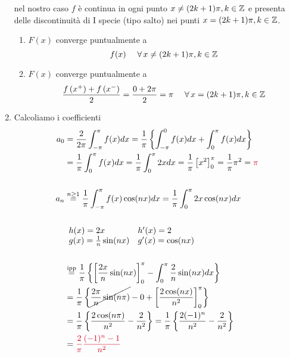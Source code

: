 \begin{enumerate}
nel nostro caso $f$ è continua in ogni punto $x\neq (2k + 1) \pi, k\in \mathbb{Z} $ e presenta delle discontinuità di I specie (tipo salto) nei punti $x = (2k + 1) \pi, k\in \mathbb{Z} $.
\begin{enumerate}
\item $F(x)$ converge puntualmente a
\begin{equation*}
f(x) \ \ \ \ \forall x\neq (2k + 1) \pi, k\in \ZZ 
\end{equation*}
\item $F(x)$ converge puntualmente a
\begin{equation*}
\frac{f\left(x^{+}\right) + f\left(x^{-}\right)}{2} = \frac{0 + 2\pi}{2} = \pi \ \ \ \ \forall x = (2k + 1) \pi, k\in \ZZ 
\end{equation*}
\end{enumerate}
\item Calcoliamo i coefficienti
\begin{align*}
a_{0} & = \frac{2}{2\pi}\int^{\pi}_{- \pi} f(x) dx = \frac{1}{\pi}\left\{\int^{0}_{- \pi} f(x) dx + \int^{\pi}_{0} f(x) dx\right\}\\
 & = \frac{1}{\pi}\int^{\pi}_{0} f(x) dx = \frac{1}{\pi}\int^{\pi}_{0} 2xdx = \frac{1}{\pi}\left[ x^{2}\right]^{\pi}_{0} = \frac{1}{\pi} \pi^{2} = \textcolor[rgb]{0.82, 0.01, 0.11}{\pi}\\
 & \\
a_{n} & \overset{n \geq 1}{=}\frac{1}{\pi}\int^{\pi}_{- \pi} f(x)\cos(nx) dx = \frac{1}{\pi}\int^{\pi}_{0} 2x\cos(nx) dx\\
 & \\
 & 
 \begin{array}{l l}
h(x) = 2x & h'(x) = 2\\
g(x) = \frac{1}{n}\sin(nx) & g'(x) = \cos(nx)
\end{array}\\
 & \\
 & \overset{\text{ipp}}{=}\frac{1}{\pi}\left\{\left[\frac{2x}{n}\sin(nx)\right]^{\pi}_{0} - \int^{\pi}_{0}\frac{2}{n}\sin(nx) dx\right\}\\
 & = \frac{1}{\pi}\left\{\cancel{\frac{2\pi}{n}\sin(n\pi)} - 0 + \left[\frac{2\cos(nx)}{n^{2}}\right]^{\pi}_{0}\right\}\\
 & = \frac{1}{\pi}\left\{\frac{2\cos(n\pi)}{n^{2}} - \frac{2}{n^{2}}\right\} = \frac{1}{\pi}\left\{\frac{2(- 1)^{n}}{n^{2}} - \frac{2}{n^{2}}\right\}\\
 & = \textcolor[rgb]{0.82, 0.01, 0.11}{\frac{2}{\pi}}\textcolor[rgb]{0.82, 0.01, 0.11}{\frac{(- 1)^{n} - 1}{n^{2}}}\\

\end{align*}
\end{enumerate}

